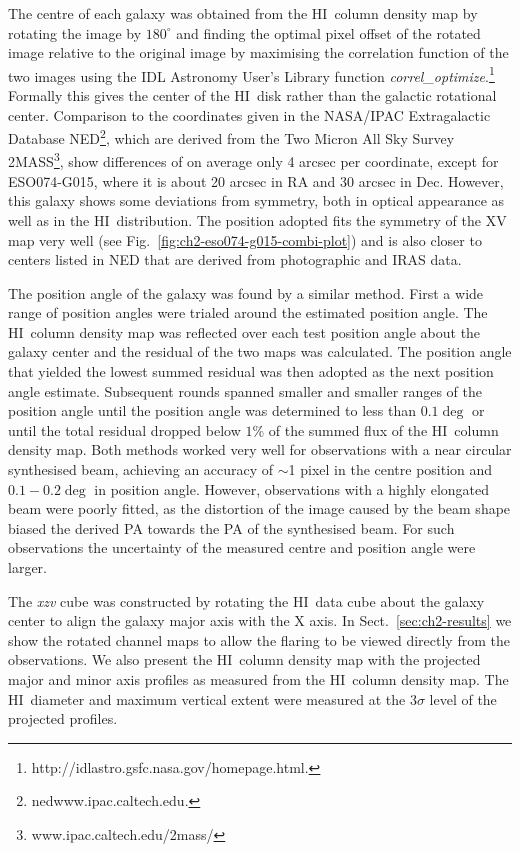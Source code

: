 \documentclass[traditabstract]{aa} %
\newcommand\HI{H{\small I}}
\begin{document}
The centre of each galaxy was obtained from the \HI\ column density map by
rotating the image by $180^{\circ}$ and finding the optimal pixel
offset of the rotated image relative to the original image by 
maximising the correlation function of the two images using the IDL
Astronomy User's Library function {\em
  correl\_optimize}.\footnote{http://idlastro.gsfc.nasa.gov/homepage.html.}
Formally this gives the center of the \HI\ disk rather than the
galactic rotational center.  
Comparison to the coordinates given in the NASA/IPAC Extragalactic Database
NED\footnote{nedwww.ipac.caltech.edu.}, which are derived from
the Two Micron All Sky Survey 2MASS\footnote{www.ipac.caltech.edu/2mass/},
show differences of on average only 4 arcsec per coordinate, except for
ESO074-G015, where it is about 20 arcsec in RA and 30 arcsec in Dec. However,
this galaxy shows some deviations from symmetry, both in optical
appearance as well as in the \HI\ distribution. The position adopted 
fits the symmetry of the XV map very well (see 
Fig.~\ref{fig:ch2-eso074-g015-combi-plot}) and is also closer to centers
listed in NED that are derived from photographic and IRAS data.

The position angle of the galaxy was found by a similar method.
First a wide range of position angles were trialed around the
estimated position angle. The \HI\ column density map was reflected
over each test position angle about the galaxy center and the
residual of the two maps was calculated. The position angle that
yielded the lowest summed residual was then adopted as the next
position angle estimate. Subsequent rounds spanned smaller and
smaller ranges of the position angle until the position angle was
determined to less than $0.1\deg$ or until the total residual dropped
below $1\%$ of the summed flux of the \HI\ column density map. Both
methods worked very well for observations with a near circular
synthesised beam, achieving an accuracy of $\sim$1 pixel in the
centre position and $0.1-0.2\deg$ in position angle. However,
observations with a highly elongated beam were poorly fitted, as
the distortion of the image caused by the beam shape biased the
derived PA towards the PA of the synthesised beam.  For such
observations the uncertainty of the measured centre and position
angle were larger.

The {\em xzv} cube was constructed by rotating the \HI\ data cube 
about the galaxy center to align the galaxy major axis with the X axis. In
Sect.~\ref{sec:ch2-results} we show the rotated channel maps to
allow the flaring to be viewed directly from the observations. We also
present the \HI\ column density map with the projected major and minor
axis profiles as measured from the \HI\ column density map. The \HI\
diameter and maximum vertical extent were measured at the $3\sigma$
level of the projected profiles.
\end{document}
